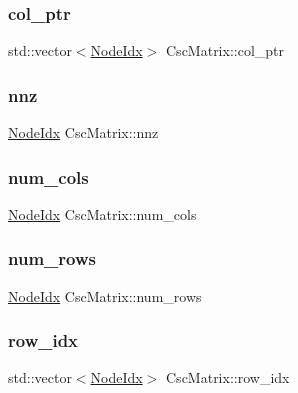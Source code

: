 \subsubsection{\texorpdfstring{col\+\_\+ptr}{col\_ptr}}
{\footnotesize\ttfamily std\+::vector$<$\hyperlink{node_8h_a5b622fe4354316a2f349615d150ae998}{Node\+Idx}$>$ Csc\+Matrix\+::col\+\_\+ptr}

\mbox{\label{structCscMatrix_ae5f18924a98bd8115bd34bb5a61bf1c1}} 
\subsubsection{\texorpdfstring{nnz}{nnz}}
{\footnotesize\ttfamily \hyperlink{node_8h_a5b622fe4354316a2f349615d150ae998}{Node\+Idx} Csc\+Matrix\+::nnz}

\mbox{\label{structCscMatrix_add293b1d06d14359190fc4cb3fd35714}} 
\subsubsection{\texorpdfstring{num\+\_\+cols}{num\_cols}}
{\footnotesize\ttfamily \hyperlink{node_8h_a5b622fe4354316a2f349615d150ae998}{Node\+Idx} Csc\+Matrix\+::num\+\_\+cols}

\mbox{\label{structCscMatrix_a9e6fea3106af21e3c05e1c497e0ee69f}} 
\subsubsection{\texorpdfstring{num\+\_\+rows}{num\_rows}}
{\footnotesize\ttfamily \hyperlink{node_8h_a5b622fe4354316a2f349615d150ae998}{Node\+Idx} Csc\+Matrix\+::num\+\_\+rows}

\mbox{\label{structCscMatrix_a2eef34de7f3687351e18cb8e1da74329}} 
\subsubsection{\texorpdfstring{row\+\_\+idx}{row\_idx}}
{\footnotesize\ttfamily std\+::vector$<$\hyperlink{node_8h_a5b622fe4354316a2f349615d150ae998}{Node\+Idx}$>$ Csc\+Matrix\+::row\+\_\+idx}


